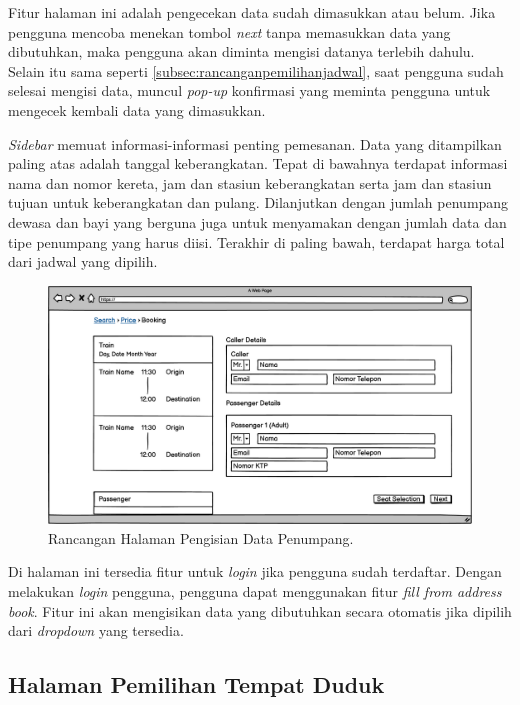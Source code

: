 Fitur halaman ini adalah pengecekan data sudah dimasukkan atau belum. Jika pengguna mencoba menekan tombol \textit{next} tanpa memasukkan data yang dibutuhkan, maka pengguna akan diminta mengisi datanya terlebih dahulu. Selain itu sama seperti \ref{subsec:rancanganpemilihanjadwal}, saat pengguna sudah selesai mengisi data, muncul \textit{pop-up} konfirmasi yang meminta pengguna untuk mengecek kembali data yang dimasukkan.

\textit{Sidebar} memuat informasi-informasi penting pemesanan. Data yang ditampilkan paling atas adalah tanggal keberangkatan. Tepat di bawahnya terdapat informasi nama dan nomor kereta, jam dan stasiun keberangkatan serta jam dan stasiun tujuan untuk keberangkatan dan pulang. Dilanjutkan dengan jumlah penumpang dewasa dan bayi yang berguna juga untuk menyamakan dengan jumlah data dan tipe penumpang yang harus diisi. Terakhir di paling bawah, terdapat harga total dari jadwal yang dipilih.

\begin{figure}[H]
\center
\includegraphics[width=\textwidth,height=\textheight,keepaspectratio]{Gambar/Halaman Pengisian Identitas.png}
\caption{Rancangan Halaman Pengisian Data Penumpang.}
    \label{img:rancanganisidata}
\end{figure}

Di halaman ini tersedia fitur untuk \textit{login} jika pengguna sudah terdaftar. Dengan melakukan \textit{login} pengguna, pengguna dapat menggunakan fitur \textit{fill from address book}. Fitur ini akan mengisikan data yang dibutuhkan secara otomatis jika dipilih dari \textit{dropdown} yang tersedia.

\subsection{Halaman Pemilihan Tempat Duduk}
\label{subsec:rancanganpemilihankursi}


